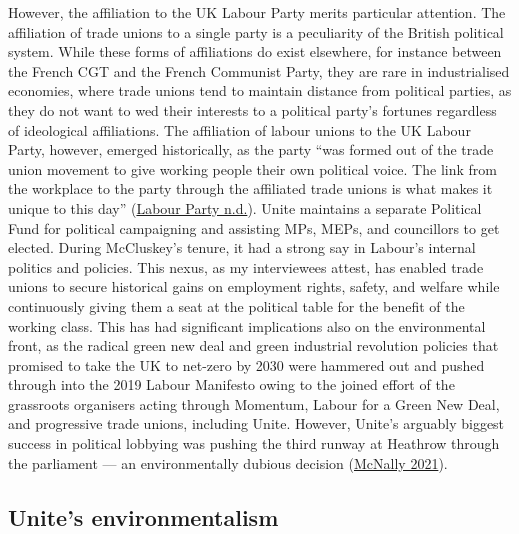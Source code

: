 \documentclass[a4paper, nobind]{templates/ociamthesis}
\begin{document}
However, the affiliation to the UK Labour Party merits particular attention. The affiliation of trade unions to a single party is a peculiarity of the British political system. While these forms of affiliations do exist elsewhere, for instance between the French CGT and the French Communist Party, they are rare in industrialised economies, where trade unions tend to maintain distance from political parties, as they do not want to wed their interests to a political party's fortunes regardless of ideological affiliations. The affiliation of labour unions to the UK Labour Party, however, emerged historically, as the party ``was formed out of the trade union movement to give working people their own political voice. The link from the workplace to the party through the affiliated trade unions is what makes it unique to this day'' (\protect\hyperlink{ref-labour_party_affiliated_}{Labour Party n.d.}). Unite maintains a separate Political Fund for political campaigning and assisting MPs, MEPs, and councillors to get elected. During McCluskey's tenure, it had a strong say in Labour's internal politics and policies. This nexus, as my interviewees attest, has enabled trade unions to secure historical gains on employment rights, safety, and welfare while continuously giving them a seat at the political table for the benefit of the working class. This has had significant implications also on the environmental front, as the radical green new deal and green industrial revolution policies that promised to take the UK to net-zero by 2030 were hammered out and pushed through into the 2019 Labour Manifesto owing to the joined effort of the grassroots organisers acting through Momentum, Labour for a Green New Deal, and progressive trade unions, including Unite. However, Unite's arguably biggest success in political lobbying was pushing the third runway at Heathrow through the parliament --- an environmentally dubious decision (\protect\hyperlink{ref-mcnally_big_2021}{McNally 2021}).

\hypertarget{unites-environmentalism}{%
\subsection{Unite's environmentalism}\label{unites-environmentalism}}
\end{document}
